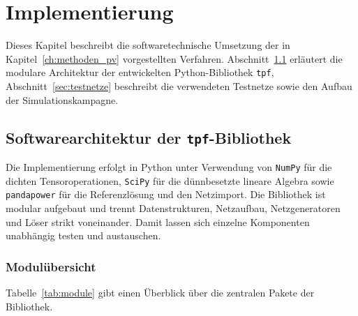 \chapter{Implementierung}
\label{chap:implementierung}

Dieses Kapitel beschreibt die softwaretechnische Umsetzung der in
Kapitel~\ref{ch:methoden_pv} vorgestellten Verfahren. Abschnitt~\ref{sec:architektur}
erläutert die modulare Architektur der entwickelten Python-Bibliothek \texttt{tpf},
Abschnitt~\ref{sec:testnetze} beschreibt die verwendeten Testnetze sowie den Aufbau
der Simulationskampagne.

\section{Softwarearchitektur der \texttt{tpf}-Bibliothek}
\label{sec:architektur}

Die Implementierung erfolgt in Python unter Verwendung von \texttt{NumPy} für die
dichten Tensoroperationen, \texttt{SciPy} für die dünnbesetzte lineare Algebra sowie
\texttt{pandapower} für die Referenzlösung und den Netzimport. Die Bibliothek ist
modular aufgebaut und trennt Datenstrukturen, Netzaufbau, Netzgeneratoren und Löser
strikt voneinander. Damit lassen sich einzelne Komponenten unabhängig testen und
austauschen.

\subsection{Modulübersicht}

Tabelle~\ref{tab:module} gibt einen Überblick über die zentralen Pakete der Bibliothek.

